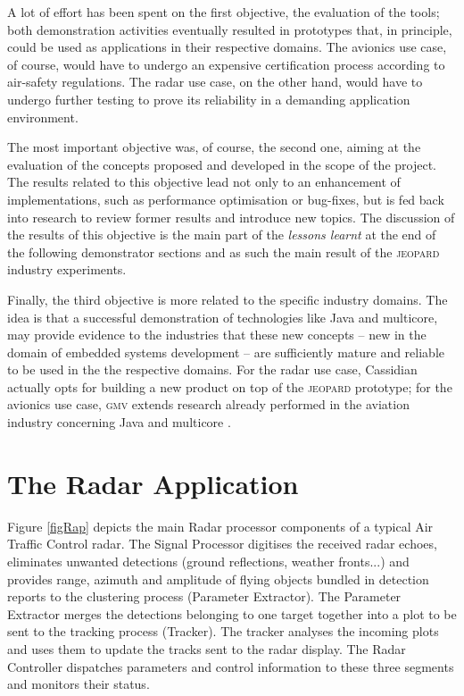 \documentclass{sig-alternate}
\newcommand{\acronym}[1]{\textsc{#1}}
\begin{document}
A lot of effort has been spent on the first objective, 
the evaluation of the tools; both demonstration activities
eventually resulted in prototypes that, in principle, could be
used as applications in their respective domains.
The avionics use case, of course, would have to undergo 
an expensive certification process according to air-safety regulations.
The radar use case, on the other hand, would have 
to undergo further testing to prove its reliability
in a demanding application environment.

The most important objective was, of course, the second one,
aiming at the evaluation of the concepts proposed and developed
in the scope of the project. 
The results related to this objective lead not only
to an enhancement of implementations, 
such as performance optimisation
or bug-fixes, but is fed back into research 
to review former results and introduce new topics. 
The discussion of the results of this objective 
is the main part of the \textit{lessons learnt} 
at the end of the following demonstrator sections
and as such the main result of the \acronym{jeopard} industry experiments.

Finally, the third objective is more related to the specific industry domains.
The idea is that a successful demonstration of technologies
like Java and multicore,
may provide evidence to the industries
that these new concepts 
-- new in the domain of embedded systems development  --
are sufficiently mature and reliable to be used
in the the respective domains.
For the radar use case, 
Cassidian actually opts for building a new product
on top of the \acronym{jeopard} prototype;
for the avionics use case,
\acronym{gmv} extends research already performed
in the aviation industry concerning Java and multicore \cite{DIANA}.

\section{The Radar Application}\label{sec:radar}

Figure \ref{figRap} depicts the main Radar processor components 
of a typical Air Traffic Control radar. 
The Signal Processor digitises the received radar echoes,
eliminates unwanted detections (ground reflections, weather fronts...) and
provides range, azimuth and amplitude of flying objects bundled in detection
reports to the clustering process (Parameter Extractor). 
The Parameter Extractor merges the detections 
belonging to one target together into a plot to be sent 
to the tracking process (Tracker). 
The tracker analyses the incoming plots 
and uses them to update the tracks sent to the radar display. 
The Radar Controller dispatches parameters 
and control information to these three segments and monitors their status.
\end{document}
